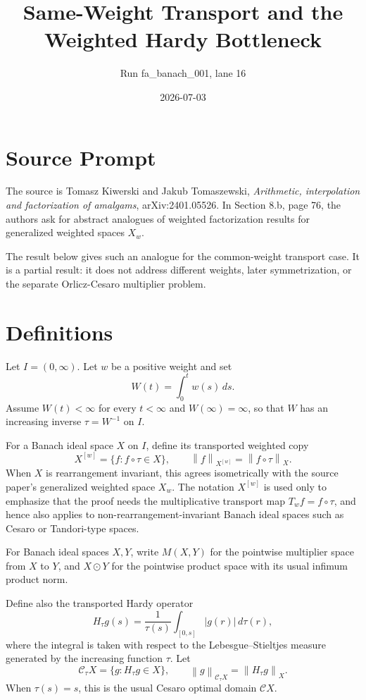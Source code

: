 \documentclass[11pt]{article}
\title{Same-Weight Transport and the Weighted Hardy Bottleneck}
\author{Run fa\_banach\_001, lane 16}
\date{2026-07-03}
\newcommand{\norm}[1]{\left\lVert #1 \right\rVert}
\newcommand{\odotprod}{\odot}
\newcommand{\C}{\mathcal{C}}
\begin{document}
\maketitle

\section*{Source Prompt}

The source is Tomasz Kiwerski and Jakub Tomaszewski, \emph{Arithmetic,
interpolation and factorization of amalgams}, arXiv:2401.05526.  In Section
8.b, page 76, the authors ask for abstract analogues of weighted factorization
results for generalized weighted spaces \(X_w\).

The result below gives such an analogue for the common-weight transport case.
It is a partial result: it does not address different weights, later
symmetrization, or the separate Orlicz-Cesaro multiplier problem.

\section*{Definitions}

Let \(I=(0,\infty)\).  Let \(w\) be a positive weight and set
\[
  W(t)=\int_0^t w(s)\,ds .
\]
Assume \(W(t)<\infty\) for every \(t<\infty\) and \(W(\infty)=\infty\), so that
\(W\) has an increasing inverse \(\tau=W^{-1}\) on \(I\).

For a Banach ideal space \(X\) on \(I\), define its transported weighted copy
\[
  X^{[w]}=\{f: f\circ\tau\in X\},\qquad
  \norm{f}_{X^{[w]}}=\norm{f\circ\tau}_{X}.
\]
When \(X\) is rearrangement invariant, this agrees isometrically with the
source paper's generalized weighted space \(X_w\).  The notation \(X^{[w]}\)
is used only to emphasize that the proof needs the multiplicative transport
map \(T_w f=f\circ\tau\), and hence also applies to non-rearrangement-invariant
Banach ideal spaces such as Cesaro or Tandori-type spaces.

For Banach ideal spaces \(X,Y\), write \(M(X,Y)\) for the pointwise multiplier
space from \(X\) to \(Y\), and \(X\odotprod Y\) for the pointwise product space
with its usual infimum product norm.

Define also the transported Hardy operator
\[
  H_\tau g(s)=\frac{1}{\tau(s)}\int_{[0,s]} |g(r)|\,d\tau(r),
\]
where the integral is taken with respect to the Lebesgue--Stieltjes measure
generated by the increasing function \(\tau\).  Let
\[
  \C_\tau X=\{g: H_\tau g\in X\},\qquad
  \norm{g}_{\C_\tau X}=\norm{H_\tau g}_X .
\]
When \(\tau(s)=s\), this is the usual Cesaro optimal domain \(\C X\).
\end{document}
